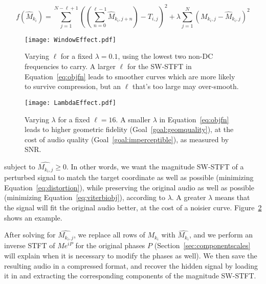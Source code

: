 \documentclass[runningheads]{llncs}
\begin{document}
\begin{equation}
  \label{eq:objfn}
  f(\hat{M}_{k_i}) = \sum_{j=1}^{N-\ell+1} \left( \left( \sum_{n = 0}^{\ell-1} \hat{M}_{k_i, j+n} \right) - T_{i, j} \right)^2 + \lambda \sum_{j=1}^N \left( M_{k_i, j} - \hat{M}_{k_i, j} \right)^2
\end{equation}



\begin{figure}
  \centering
  \texttt{[image: WindowEffect.pdf]}
  \caption{Varying $\ell$ for a fixed $\lambda=0.1$, using the lowest two non-DC frequencies to carry.  A larger $\ell$ for the SW-STFT in Equation~\ref{eq:objfn} leads to smoother curves which are more likely to survive compression, but an $\ell$ that's too large may over-smooth.}
  \label{fig:WindowEffect}
\end{figure}

\begin{figure}
  \centering
  \texttt{[image: LambdaEffect.pdf]}
  \caption{Varying $\lambda$ for a fixed $\ell=16$.  A smaller $\lambda$ in Equation~\ref{eq:objfn} leads to higher geometric fidelity (Goal~\ref{goal:geomquality}), at the cost of audio quality (Goal~\ref{goal:imperceptible}), as measured by SNR.}
  \label{fig:LambdaEffect}
\end{figure}



subject to $\hat{M_{k_i, j}} \geq 0$.  In other words, we want the magnitude SW-STFT of a perturbed signal to match the target coordinate as well as possible (minimizing Equation~\ref{eq:distortion}), while preserving the original audio as well as possible (minimizing Equation~\ref{eq:viterbiobj}), according to $\lambda$.  A greater $\lambda$ means that the signal will fit the original audio better, at the cost of a noisier curve.  Figure~\ref{fig:LambdaEffect} shows an example.

After solving for $\hat{M_{k_i, j}}$, we replace all rows of $M_{k_i}$ with $\hat{M_{k_i}}$, and we perform an inverse STFT of $M e^{i P}$ for the original phases $P$ (Section~\ref{sec:componentscales} will explain when it is necessary to modify the phases as well).  We then save the resulting audio in a compressed format, and recover the hidden signal by loading it in and extracting the corresponding components of the magnitude SW-STFT.
\end{document}
